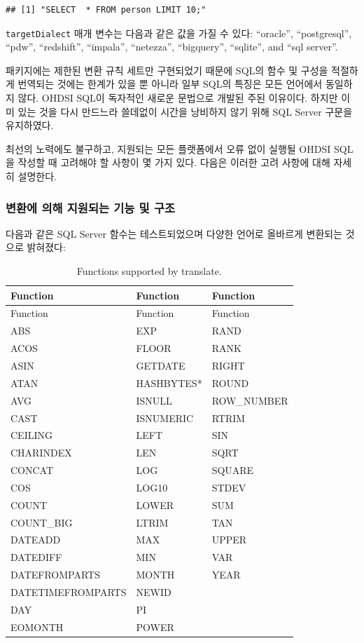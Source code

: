 \documentclass[11pt]{book}
\theoremstyle{definition}
\theoremstyle{definition}
\theoremstyle{definition}
\theoremstyle{remark}
\let\BeginKnitrBlock\begin \let\EndKnitrBlock\end
\begin{document}
\begin{verbatim}
## [1] "SELECT  * FROM person LIMIT 10;"
\end{verbatim}

\texttt{targetDialect} 매개 변수는 다음과 같은 값을 가질 수 있다:
``oracle'', ``postgresql'', ``pdw'', ``redshift'', ``impala'',
``netezza'', ``bigquery'', ``sqlite'', and ``sql server''.

\BeginKnitrBlock{rmdimportant}
패키지에는 제한된 변환 규칙 세트만 구현되었기 때문에 SQL의 함수 및
구성을 적절하게 번역되는 것에는 한계가 있을 뿐 아니라 일부 SQL의 특징은
모든 언어에서 동일하지 않다. OHDSI SQL이 독자적인 새로운 문법으로 개발된
주된 이유이다. 하지만 이미 있는 것을 다시 만드느라 쓸데없이 시간을
낭비하지 않기 위해 SQL Server 구문을 유지하였다.
\EndKnitrBlock{rmdimportant}

최선의 노력에도 불구하고, 지원되는 모든 플랫폼에서 오류 없이 실행될
OHDSI SQL을 작성할 때 고려해야 할 사항이 몇 가지 있다. 다음은 이러한
고려 사항에 대해 자세히 설명한다.

\subsubsection*{변환에 의해 지원되는 기능 및 구조}\label{-----}

다음과 같은 SQL Server 함수는 테스트되었으며 다양한 언어로 올바르게
변환되는 것으로 밝혀졌다: 

\begin{longtable}[]{@{}lll@{}}
\caption{\label{tab:sqlFunctions} Functions supported by
translate.}\tabularnewline
\toprule
Function & Function & Function\tabularnewline
\midrule
\endfirsthead
\toprule
Function & Function & Function\tabularnewline
\midrule
\endhead
ABS & EXP & RAND\tabularnewline
ACOS & FLOOR & RANK\tabularnewline
ASIN & GETDATE & RIGHT\tabularnewline
ATAN & HASHBYTES* & ROUND\tabularnewline
AVG & ISNULL & ROW\_NUMBER\tabularnewline
CAST & ISNUMERIC & RTRIM\tabularnewline
CEILING & LEFT & SIN\tabularnewline
CHARINDEX & LEN & SQRT\tabularnewline
CONCAT & LOG & SQUARE\tabularnewline
COS & LOG10 & STDEV\tabularnewline
COUNT & LOWER & SUM\tabularnewline
COUNT\_BIG & LTRIM & TAN\tabularnewline
DATEADD & MAX & UPPER\tabularnewline
DATEDIFF & MIN & VAR\tabularnewline
DATEFROMPARTS & MONTH & YEAR\tabularnewline
DATETIMEFROMPARTS & NEWID &\tabularnewline
DAY & PI &\tabularnewline
EOMONTH & POWER &\tabularnewline
\bottomrule
\end{longtable}
\end{document}
